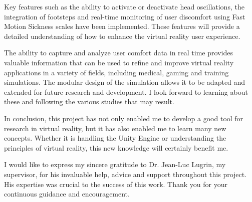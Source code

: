 \documentclass[american]{acmtog} %
\begin{document}
Key features such as the ability to activate or deactivate head oscillations, the integration of footsteps and real-time monitoring of user discomfort using Fast Motion Sickness scales have been implemented. These features will provide a detailed understanding of how to enhance the virtual reality user experience.

The ability to capture and analyze user comfort data in real time provides valuable information that can be used to refine and improve virtual reality applications in a variety of fields, including medical, gaming and training simulations. The modular design of the simulation allows it to be adapted and extended for future research and development. I look forward to learning about these and following the various studies that may result.

In conclusion, this project has not only enabled me to develop a good tool for research in virtual reality, but it has also enabled me to learn many new concepts. Whether it is handling the Unity Engine or understanding the principles of virtual reality, this new knowledge will certainly benefit me.

\begin{acks}
I would like to express my sincere gratitude to Dr. Jean-Luc Lugrin, my supervisor, for his invaluable help, advice and support throughout this project. His expertise was crucial to the success of this work. Thank you for your continuous guidance and encouragement.
\end{acks}

\listoffigures

\printbibliography
\end{document}
